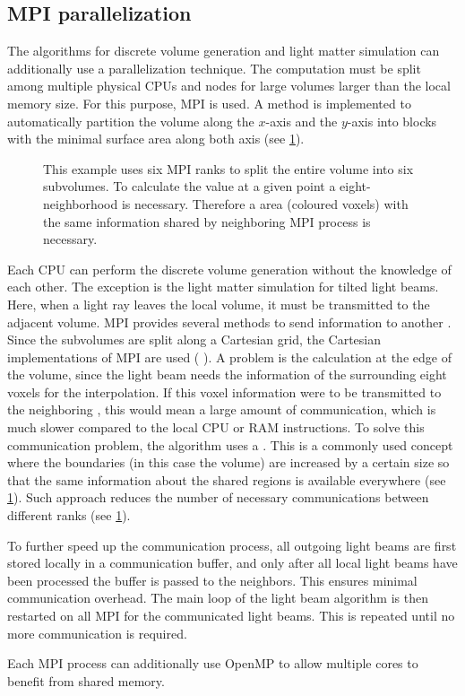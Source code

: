\subsection{MPI parallelization}\label{sec:mpiSim}
%
The algorithms for discrete volume generation and light matter simulation can additionally use a parallelization technique.
The computation must be split among multiple physical \acp{CPU} and nodes for large volumes larger than the local memory size.
For this purpose,  \ac{MPI} is used.
A method is implemented to automatically partition the volume along the $x$-axis and the $y$-axis into blocks with the minimal surface area along both axis (see \cref{fig:com_halo}).
\par
%
\begin{figure}[!t]
    \centering
    \setlength{\tikzwidth}{0.85\textwidth}
    \caption[]{ This example uses six \ac{MPI} ranks to split the entire volume into six subvolumes. To calculate the value at a given point a eight-neighborhood is necessary. Therefore a  area (coloured voxels) with the same information shared by neighboring \ac{MPI} process is necessary.}
    \label{fig:com_halo}
\end{figure}
%
Each \ac{CPU} can perform the discrete volume generation without the knowledge of each other.
The exception is the light matter simulation for tilted light beams.
Here, when a light ray leaves the local volume, it must be transmitted to the adjacent volume.
\ac{MPI} provides several methods to send information to another .
Since the subvolumes are split along a Cartesian grid, the Cartesian implementations of \ac{MPI} are used (\eg{} ).
A problem is the calculation at the edge of the volume, since the light beam needs the information of the surrounding eight voxels for the interpolation.
If this voxel information were to be transmitted to the neighboring , this would mean a large amount of communication, which is much slower compared to the local \ac{CPU} or \ac{RAM} instructions.
To solve this communication problem, the algorithm uses a .
This is a commonly used concept where the boundaries (in this case the volume) are increased by a certain size so that the same information about the shared regions is available everywhere (see \cref{fig:com_halo}).
Such approach reduces the number of necessary communications between different ranks (see \cref{fig:com_halo}).
\par
%
To further speed up the communication process, all outgoing light beams are first stored locally in a communication buffer, and only after all local light beams have been processed the buffer is passed to the neighbors.
This ensures minimal communication overhead.
The main loop of the light beam algorithm is then restarted on all \ac{MPI}  for the communicated light beams.
This is repeated until no more communication is required.
\par
%
Each \ac{MPI} process can additionally use \ac{OpenMP} to allow multiple cores to benefit from shared memory.
